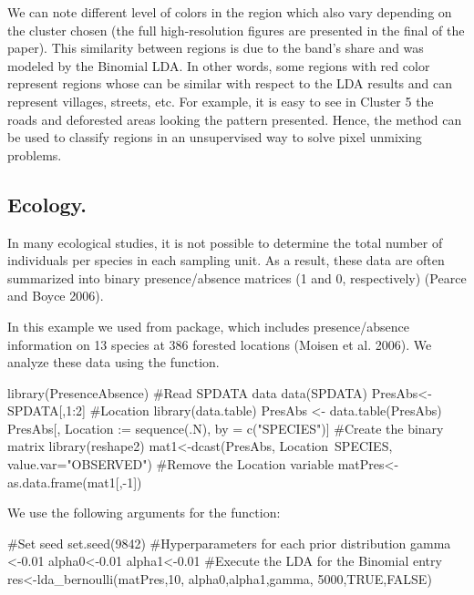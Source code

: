 \documentclass[article]{jss}
\begin{document}
We can note different level of colors in the region which also vary
depending on the cluster chosen (the full high-resolution figures are
presented in the final of the paper). This similarity between regions is
due to the band's share and was modeled by the Binomial LDA. In other
words, some regions with red color represent regions whose can be
similar with respect to the LDA results and can represent villages,
streets, etc. For example, it is easy to see in Cluster 5 the roads and
deforested areas looking the pattern presented. Hence, the method can be
used to classify regions in an unsupervised way to solve pixel unmixing
problems.

\subsection{Ecology.}\label{ecology.}

In many ecological studies, it is not possible to determine the total
number of individuals per species in each sampling unit. As a result,
these data are often summarized into binary presence/absence matrices (1
and 0, respectively) (Pearce and Boyce 2006).

In this example we used  from 
package, which includes presence/absence information on 13 species at
386 forested locations (Moisen et al. 2006). We analyze these data using
the  function.

\begin{CodeChunk}
\begin{CodeInput}
library(PresenceAbsence)
#Read SPDATA data
data(SPDATA)
PresAbs<-SPDATA[,1:2]
#Location
library(data.table)
PresAbs <- data.table(PresAbs)
PresAbs[, Location := sequence(.N), by = c("SPECIES")]
#Create the binary matrix
library(reshape2)
mat1<-dcast(PresAbs, 
            Location~SPECIES,  
            value.var="OBSERVED")
#Remove the Location variable
matPres<-as.data.frame(mat1[,-1])
\end{CodeInput}
\end{CodeChunk}

We use the following arguments for the  function:

\begin{CodeChunk}
\begin{CodeInput}
#Set seed
set.seed(9842)
#Hyperparameters for each prior distribution
gamma <-0.01
alpha0<-0.01
alpha1<-0.01
#Execute the LDA for the Binomial entry
res<-lda_bernoulli(matPres,10,
                           alpha0,alpha1,gamma,
                           5000,TRUE,FALSE)
\end{CodeInput}
\end{CodeChunk}
\end{document}
